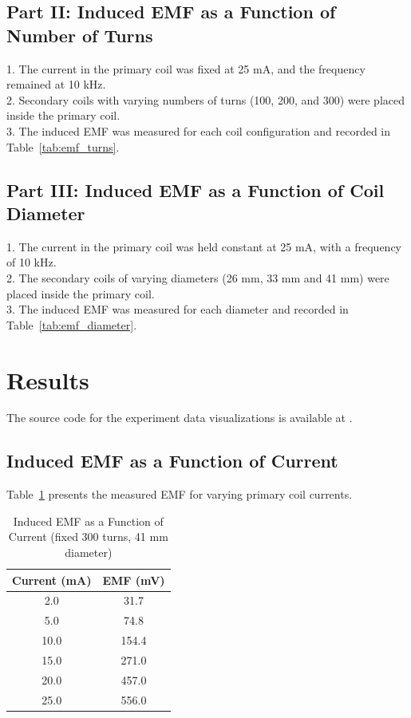 \documentclass[journal]{IEEEtran}
\begin{document}
\subsection{Part II: Induced EMF as a Function of Number of Turns}
1. The current in the primary coil was fixed at 25 mA, and the frequency remained at 10 kHz.\\
2. Secondary coils with varying numbers of turns (100, 200, and 300) were placed inside the primary coil.\\
3. The induced EMF was measured for each coil configuration and recorded in Table~\ref{tab:emf_turns}.\\

\subsection{Part III: Induced EMF as a Function of Coil Diameter}
1. The current in the primary coil was held constant at 25 mA, with a frequency of 10 kHz.\\
2. The secondary coils of varying diameters (26 mm, 33 mm and 41 mm) were placed inside the primary coil.\\
3. The induced EMF was measured for each diameter and recorded in Table~\ref{tab:emf_diameter}.\\

\section{Results}
The source code for the experiment data visualizations is available at \cite[5th Experiment Magnetic Introduction/Calculations.ipynb]{github}.

\subsection{Induced EMF as a Function of Current}
Table~\ref{tab:emf_current} presents the measured EMF for varying primary coil currents.

\begin{table}[H]
    \centering
    \caption{Induced EMF as a Function of Current (fixed 300 turns, 41 mm diameter)}
    \begin{tabular}{cc}
        \hline
        Current (mA) & EMF (mV) \\ \hline
        2.0 & 31.7 \\
        5.0 & 74.8 \\
        10.0 & 154.4 \\
        15.0 & 271.0 \\
        20.0 & 457.0 \\ 
        25.0 & 556.0 \\ \hline
    \end{tabular}
    \label{tab:emf_current}
\end{table}
\end{document}
